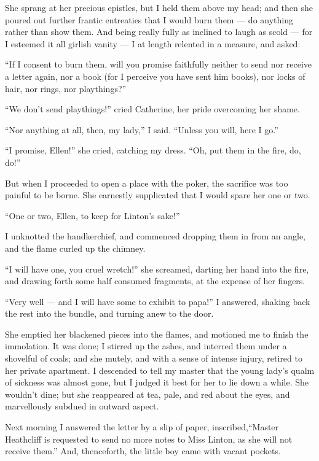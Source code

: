 \par She sprang at her precious epistles, but I held them above my head; and then she poured out further frantic entreaties that I would burn them — do anything rather than show them. And being really fully as inclined to laugh as scold — for I esteemed it all girlish vanity — I at length relented in a measure, and asked:
\par “If I consent to burn them, will you promise faithfully neither to send nor receive a letter again, nor a book (for I perceive you have sent him books), nor locks of hair, nor rings, nor playthings?”
\par “We don't send playthings!” cried Catherine, her pride overcoming her shame.
\par “Nor anything at all, then, my lady,” I said. “Unless you will, here I go.”
\par “I promise, Ellen!” she cried, catching my dress. “Oh, put them in the fire, do, do!”
\par But when I proceeded to open a place with the poker, the sacrifice was too painful to be borne. She earnestly supplicated that I would spare her one or two.
\par “One or two, Ellen, to keep for Linton's sake!”
\par I unknotted the handkerchief, and commenced dropping them in from an angle, and the flame curled up the chimney.
\par “I will have one, you cruel wretch!” she screamed, darting her hand into the fire, and drawing forth some half consumed fragments, at the expense of her fingers.
\par “Very well — and I will have some to exhibit to papa!” I answered, shaking back the rest into the bundle, and turning anew to the door.
\par She emptied her blackened pieces into the flames, and motioned me to finish the immolation. It was done; I stirred up the ashes, and interred them under a shovelful of coals; and she mutely, and with a sense of intense injury, retired to her private apartment. I descended to tell my master that the young lady's qualm of sickness was almost gone, but I judged it best for her to lie down a while. She wouldn't dine; but she reappeared at tea, pale, and red about the eyes, and marvellously subdued in outward aspect.
\par Next morning I answered the letter by a slip of paper, inscribed,“Master Heathcliff is requested to send no more notes to Miss Linton, as she will not receive them.” And, thenceforth, the little boy came with vacant pockets.






